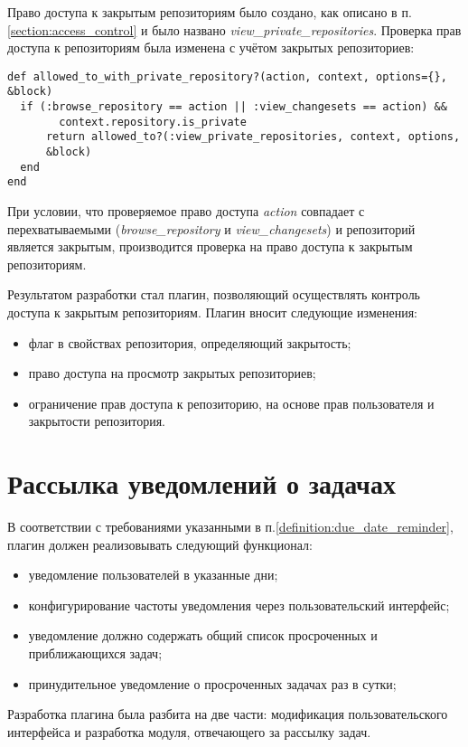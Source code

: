 Право доступа к закрытым репозиториям было создано, как описано в п.
\ref{section:access_control} и было названо
\textit{view\_private\_repositories}.
Проверка прав доступа к репозиториям была изменена с учётом закрытых
репозиториев:
\small{\begin{lstlisting}
def allowed_to_with_private_repository?(action, context, options={}, &block)
  if (:browse_repository == action || :view_changesets == action) &&
        context.repository.is_private 
      return allowed_to?(:view_private_repositories, context, options,
      &block)       
  end
end
\end{lstlisting}}
При условии, что проверяемое право доступа \textit{action} совпадает с
перехватываемыми (\textit{browse\_repository} и \textit{view\_changesets}) и
репозиторий является закрытым, производится проверка на право доступа к
закрытым репозиториям.

Результатом разработки стал плагин, позволяющий осуществлять контроль доступа к
закрытым репозиториям. Плагин вносит следующие изменения:
\begin{itemize}
  \item флаг в свойствах репозитория, определяющий закрытость;
  \item право доступа на просмотр закрытых репозиториев;
  \item ограничение прав доступа к репозиторию, на основе прав пользователя и
  закрытости репозитория.
\end{itemize}


\section{Рассылка уведомлений о задачах}
В соответствии с требованиями указанными в
п.\ref{definition:due_date_reminder}, плагин должен реализовывать следующий
функционал:
\begin{itemize}
  \item уведомление пользователей в указанные дни;
  \item конфигурирование частоты уведомления через пользовательский интерфейс;
  \item уведомление должно содержать общий список просроченных и приближающихся
  задач;
  \item принудительное уведомление о просроченных задачах раз в сутки;
\end{itemize}
Разработка плагина была разбита на две части: модификация пользовательского
интерфейса и разработка модуля, отвечающего за рассылку задач.

